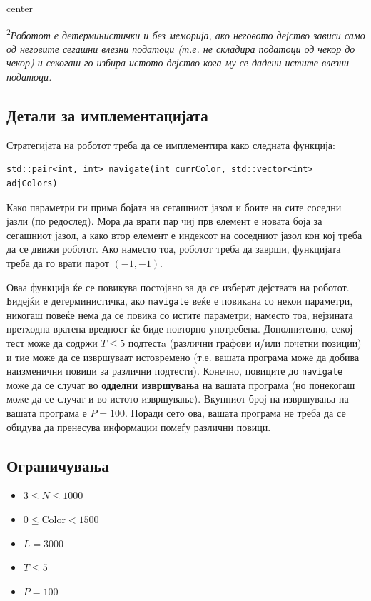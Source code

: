 \documentclass[12pt]{article}
\begin{document}
\begin{adjustbox}{center}

\end{adjustbox}

\textsuperscript{2}\textit{Роботот е детерминистички и без меморија, ако неговото дејство зависи само од неговите сегашни влезни податоци (т.е. не складира податоци од чекор до чекор) и секогаш го избира истото дејство кога му се дадени истите влезни податоци.}

\subsection{Детали за имплементацијата}
Стратегијата на роботот треба да се имплементира како следната функција:
\begin{lstlisting}
std::pair<int, int> navigate(int currColor, std::vector<int> adjColors)
\end{lstlisting}

Како параметри ги прима бојата на сегашниот јазол и боите на сите соседни јазли (по редослед). Мора да врати пар чиј прв елемент е новата боја за сегашниот јазол, а како втор елемент е индексот на соседниот јазол кон кој треба да се движи роботот. Ако наместо тоа, роботот треба да заврши, функцијата треба да го врати парот $(-1, -1)$.

Оваа функција ќе се повикува постојано за да се изберат дејствата на роботот. Бидејќи е детерминистичка, ако \texttt{navigate} веќе е повикана со некои параметри, никогаш повеќе нема да се повика со истите параметри; наместо тоа, нејзината претходна вратена вредност ќе биде повторно употребена. Дополнително, секој тест може да содржи $T \leq 5$ подтестa (различни графови и/или почетни позиции) и тие може да се извршуваат истовремено (т.е. вашата програма може да добива наизменични повици за различни подтести). Конечно, повиците до \texttt{navigate} може да се случат во \textbf{одделни извршувања} на вашата програма (но понекогаш може да се случат и во истото извршување). Вкупниот број на извршувања на вашата програма е $P = 100$. Поради сето ова, вашата програма не треба да се обидува да пренесува информации помеѓу различни повици.

\subsection{Ограничувања}

\begin{itemize}
\item $3 \leq N \leq 1000$
\item $0 \leq \mathrm{Color} < 1500$
\item $L = 3000$
\item $T \leq 5$
\item $P = 100$
\end{itemize}
\end{document}
